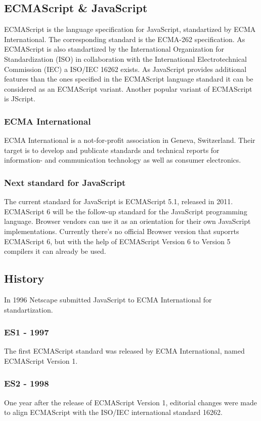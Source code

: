 \documentclass{bioinfo}
\begin{document}
\subsection{ECMAScript \& JavaScript}
ECMAScript is the language specification for JavaScript, standartized by ECMA International. The corresponding standard is the ECMA-262 specification. 
As ECMAScript is also standartized by the International Organization for Standardization (ISO) in collaboration with the International Electrotechnical Commission (IEC) a ISO/IEC 16262 exists.
As JavaScript provides additional features than the ones specified in the ECMAScript language standard it can be considered as an ECMAScript variant. Another popular variant of ECMAScript is JScript.
\subsubsection{ECMA International}
ECMA International is a not-for-profit association in Geneva, Switzerland. 
Their target is to develop and publicate standards and technical reports for information- and
communication technology as well as consumer electronics. 
\subsubsection{Next standard for JavaScript}
The current standard for JavaScript is ECMAScript 5.1, released in 2011. 
ECMAScript 6 will be the follow-up standard for the JavaScript programming language.
Browser vendors can use it as an orientation for their own JavaScript implementations.
Currently there's no official Browser version that suporrts ECMAScript 6, but with the 
help of ECMAScript Version 6 to Version 5 compilers it can already be used.

\subsection{History}
In 1996 Netscape submitted JavaScript to ECMA International for standartization.
\subsubsection*{\textbf{ES1 - 1997}}
The first ECMAScript standard was released by ECMA International, named ECMAScript Version 1.
\subsubsection*{\textbf{ES2 - 1998}}
One year after the release of ECMAScript Version 1, editorial changes were made to align ECMAScript with the ISO/IEC international standard 16262.
\end{document}
